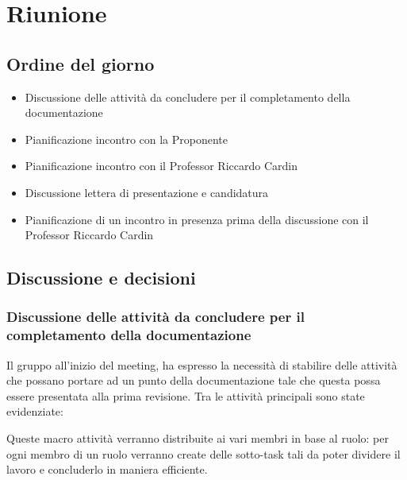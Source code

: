 \section{Riunione}
\subsection{Ordine del giorno}
\begin{itemize}
	\item Discussione delle attività da concludere per il completamento della documentazione
	\item Pianificazione incontro con la Proponente
	\item Pianificazione incontro con il Professor Riccardo Cardin
	\item Discussione lettera di presentazione e candidatura \RTB
	\item Pianificazione di un incontro in presenza prima della discussione con il Professor Riccardo Cardin
\end{itemize}

\subsection{Discussione e decisioni}
\subsubsection{Discussione delle attività da concludere per il completamento della documentazione}
\par Il gruppo all'inizio del meeting, ha espresso la necessità di stabilire delle attività che possano portare ad un punto della documentazione tale che questa possa essere presentata alla prima revisione. 
Tra le attività principali sono state evidenziate:
\par Queste macro attività verranno distribuite ai vari membri in base al ruolo: per ogni membro di un ruolo verranno create delle sotto-task tali da poter dividere il lavoro e concluderlo in maniera efficiente.

